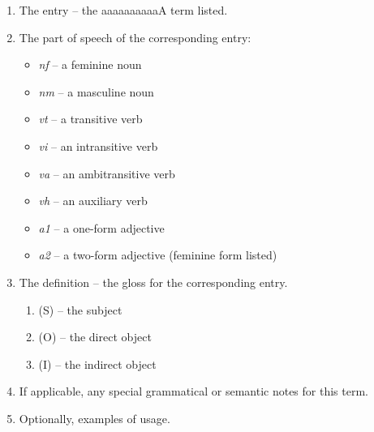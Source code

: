\documentclass{book}
\newcommand{\lname}{aaaaaaaaaaA}
\begin{document}
\begin{enumerate}
    \item The entry -- the \lname{} term listed.
    \item The part of speech of the corresponding entry:
    \begin{itemize}
      \item \textit{nf} -- a feminine noun
      \item \textit{nm} -- a masculine noun
      \item \textit{vt} -- a transitive verb
      \item \textit{vi} -- an intransitive verb
      \item \textit{va} -- an ambitransitive verb
      \item \textit{vh} -- an auxiliary verb
      \item \textit{a1} -- a one-form adjective
      \item \textit{a2} -- a two-form adjective (feminine form listed)
    \end{itemize}
    \item The definition -- the gloss for the corresponding entry.
    \begin{enumerate}
        \item (S) -- the subject
        \item (O) -- the direct object
        \item (I) -- the indirect object
    \end{enumerate}
    \item If applicable, any special grammatical or semantic notes for this term.
    \item Optionally, examples of usage.
\end{enumerate}

\begin{multicols}{2}
    
\end{multicols}
\end{document}

